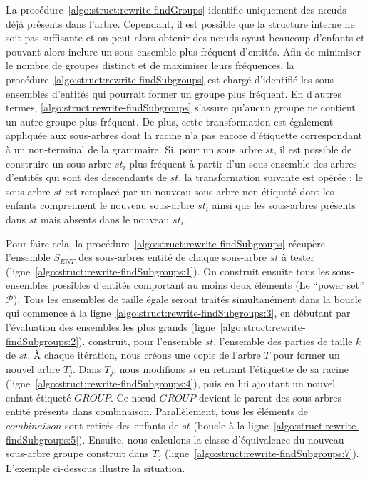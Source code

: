 La procédure~\ref{algo:struct:rewrite-findGroups} identifie uniquement des nœuds déjà présents dans l'arbre.
Cependant, il est possible que la structure interne ne soit pas suffisante et on peut alors obtenir des nœuds ayant beaucoup d'enfants et pouvant alors inclure un sous ensemble plus fréquent d'entités.
Afin de minimiser le nombre de groupes distinct et de maximiser leurs fréquences, la procédure~\ref{algo:struct:rewrite-findSubgroups} est chargé d'identifié les sous ensembles d'entités qui pourrait former un groupe plus fréquent.
En d'autres termes, \ref{algo:struct:rewrite-findSubgroups} s'assure qu'aucun groupe ne contient un autre groupe plus fréquent.
De plus, cette transformation est également appliquée aux sous-arbres dont la racine n'a pas encore d'étiquette correspondant à un non-terminal de la grammaire.
Si, pour un sous arbre $st$, il est possible de construire un sous-arbre $st_i$ plus fréquent à partir d'un sous ensemble des arbres d'entités qui sont des descendants de $st$, la transformation suivante est opérée : le sous-arbre $st$ est remplacé par un nouveau sous-arbre non étiqueté dont les enfants comprennent le nouveau sous-arbre $st_i$ ainsi que les sous-arbres présents dans $st$ mais absents dans le nouveau $st_i$.

Pour faire cela, la procédure~\ref{algo:struct:rewrite-findSubgroups} récupère l'ensemble $S_{ENT}$ des sous-arbres entité de chaque sous-arbre $st$ à tester (ligne~\ref{algo:struct:rewrite-findSubgroups:1}).
On construit ensuite tous les sous-ensembles possibles d'entités comportant au moins deux éléments (Le \enquote{power set} $\mathcal{P}$).
Tous les ensembles de taille égale seront traités simultanément dans la boucle  qui commence à la ligne~\ref{algo:struct:rewrite-findSubgroups:3}, en débutant par l'évaluation des ensembles les plus grands (ligne~\ref{algo:struct:rewrite-findSubgroups:2}).
\combination construit, pour l'ensemble $st$, l'ensemble des parties de taille $k$ de $st$.
À chaque itération, nous créons une copie de l'arbre $T$ pour former un nouvel arbre $T_j$.
Dans $T_j$, nous modifions $st$ en retirant l'étiquette de sa racine (ligne~\ref{algo:struct:rewrite-findSubgroups:4}), puis en lui ajoutant un nouvel enfant étiqueté $GROUP$.
Ce nœud $GROUP$ devient le parent des sous-arbres entité présents dans \textsf{combinaison}.
Parallèlement, tous les éléments de $combinaison$ sont retirés des enfants de $st$ (boucle à la ligne~\ref{algo:struct:rewrite-findSubgroups:5}).
Ensuite, nous calculons la classe d'équivalence du nouveau sous-arbre groupe construit dans $T_j$ (ligne~\ref{algo:struct:rewrite-findSubgroups:7}).
L'exemple ci-dessous illustre la situation.


